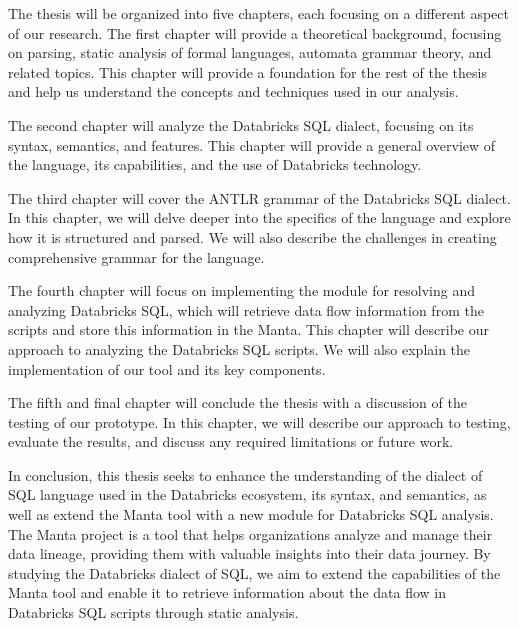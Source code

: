 The thesis will be organized into five chapters, each focusing on a different aspect of our research. The first chapter will provide a theoretical background, focusing on parsing, static analysis of formal languages, automata grammar theory, and related topics. This chapter will provide a foundation for the rest of the thesis and help us understand the concepts and techniques used in our analysis.

The second chapter will analyze the Databricks SQL dialect, focusing on its syntax, semantics, and features. This chapter will provide a general overview of the language, its capabilities, and the use of Databricks technology.

The third chapter will cover the ANTLR grammar of the Databricks SQL dialect. In this chapter, we will delve deeper into the specifics of the language and explore how it is structured and parsed. We will also describe the challenges in creating comprehensive grammar for the language.

The fourth chapter will focus on implementing the module for resolving and analyzing Databricks SQL, which will retrieve data flow information from the scripts and store this information in the Manta. This chapter will describe our approach to analyzing the Databricks SQL scripts. We will also explain the implementation of our tool and its key components.

The fifth and final chapter will conclude the thesis with a discussion of the testing of our prototype. In this chapter, we will describe our approach to testing, evaluate the results, and discuss any required limitations or future work.

In conclusion, this thesis seeks to enhance the understanding of the dialect of SQL language used in the Databricks ecosystem, its syntax, and semantics, as well as extend the Manta tool with a new module for Databricks SQL analysis. The Manta project is a tool that helps organizations analyze and manage their data lineage, providing them with valuable insights into their data journey. By studying the Databricks dialect of SQL, we aim to extend the capabilities of the Manta tool and enable it to retrieve information about the data flow in Databricks SQL scripts through static analysis.